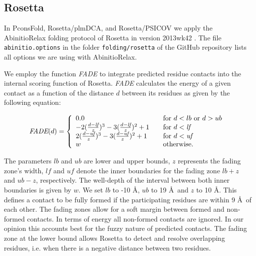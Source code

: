 \documentclass{bioinfo}
\begin{document}
\begin{methods}
\subsection{Rosetta}
In PconsFold, Rosetta/plmDCA, and Rosetta/PSICOV we apply the
AbinitioRelax folding protocol \cite[]{rohl_protein_2004} of Rosetta
in version 2013wk42 \cite[]{leaver-fay_rosetta3:_2011}. The file {\tt
  abinitio.options} in the folder {\tt folding/rosetta} of the GitHub
repository lists all options we are using with AbinitioRelax. 

We employ the function \emph{FADE} to integrate predicted residue
contacts into the internal scoring function of Rosetta. \emph{FADE}
calculates the energy of a given contact as a function of the distance
$d$ between its residues as given by the following equation:

\begin{equation}%
\textit{FADE}(d) = \left\{
\begin{array}{l l l}\label{eq:fade}
0.0 & \quad \textrm{for $d < lb$ or $d > ub$} \\
-2(\frac{d - \textit{lf}}{z})^3 - 3(\frac{d - \textit{lf}}{z})^2 + 1 & \quad \textrm{for $d < \textit{lf}$} \\
2(\frac{d - \textit{uf}}{z})^3 - 3(\frac{d - \textit{uf}}{z})^2 + 1 & \quad \textrm{for $d < \textit{uf}$} \\
w & \quad \textrm{otherwise.} \\
\end{array} \right.
\end{equation}

The parameters $lb$ and $ub$ are lower and upper bounds, $z$
represents the fading zone's width, $\textit{lf}$ and $\textit{uf}$
denote the inner boundaries for the fading zone $lb + z$ and $ub - z$,
respectively. The well-depth of the interval between both inner
boundaries is given by $w$. We set $lb$ to -10 \AA, $ub$ to 19 \AA\
and $z$ to 10 \AA. This defines a contact to be fully formed if the
participating residues are within 9 \AA\ of each other. The fading
zones allow for a soft margin between formed and non-formed
contacts. In terms of energy all non-formed contacts are ignored. In
our opinion this accounts best for the fuzzy nature of predicted
contacts. The fading zone at the lower bound allows Rosetta to detect
and resolve overlapping residues, i.e. when there is a negative
distance between two residues. 


\end{methods}
\end{document}
